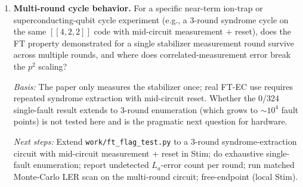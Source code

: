 \begin{enumerate}
\item \textbf{Multi-round cycle behavior.}
For a specific near-term ion-trap or superconducting-qubit cycle
experiment (e.g., a 3-round syndrome cycle on the same $[\![4,2,2]\!]$
code with mid-circuit measurement + reset), does the FT property
demonstrated for a single stabilizer measurement round survive across
multiple rounds, and where does correlated-measurement error break the
$p^2$ scaling?

\emph{Basis:} The paper only measures the stabilizer once; real FT-EC
use requires repeated syndrome extraction with mid-circuit reset. Whether
the 0/324 single-fault result extends to 3-round enumeration (which grows
to ${\sim}10^4$ fault points) is not tested here and is the pragmatic
next question for hardware.

\emph{Next steps:} Extend \texttt{work/ft\_flag\_test.py} to a 3-round
syndrome-extraction circuit with mid-circuit measurement + reset in Stim;
do exhaustive single-fault enumeration; report undetected $L_a$-error
count per round; run matched Monte-Carlo LER scan on the multi-round
circuit; free-endpoint (local Stim).
\end{enumerate}
